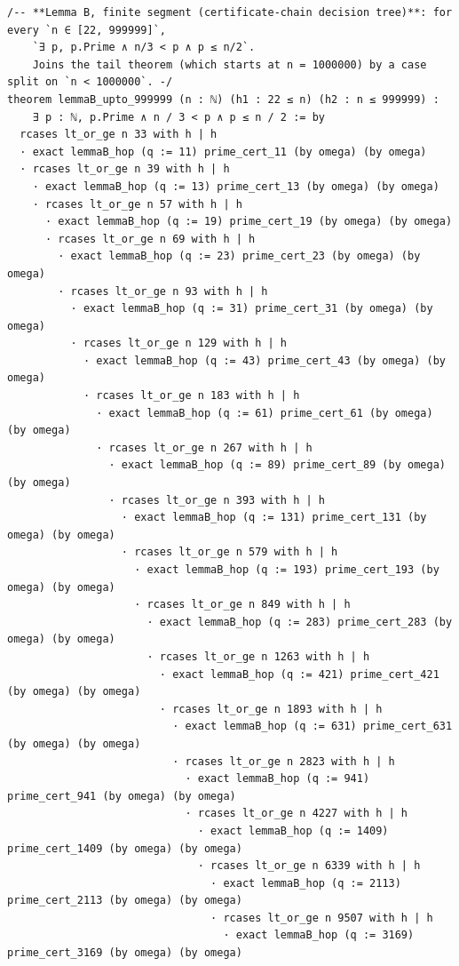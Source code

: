 \documentclass[11pt]{article}
\theoremstyle{definition}
\begin{document}
\begin{lstlisting}
/-- **Lemma B, finite segment (certificate-chain decision tree)**: for every `n ∈ [22, 999999]`,
    `∃ p, p.Prime ∧ n/3 < p ∧ p ≤ n/2`.
    Joins the tail theorem (which starts at n = 1000000) by a case split on `n < 1000000`. -/
theorem lemmaB_upto_999999 (n : ℕ) (h1 : 22 ≤ n) (h2 : n ≤ 999999) :
    ∃ p : ℕ, p.Prime ∧ n / 3 < p ∧ p ≤ n / 2 := by
  rcases lt_or_ge n 33 with h | h
  · exact lemmaB_hop (q := 11) prime_cert_11 (by omega) (by omega)
  · rcases lt_or_ge n 39 with h | h
    · exact lemmaB_hop (q := 13) prime_cert_13 (by omega) (by omega)
    · rcases lt_or_ge n 57 with h | h
      · exact lemmaB_hop (q := 19) prime_cert_19 (by omega) (by omega)
      · rcases lt_or_ge n 69 with h | h
        · exact lemmaB_hop (q := 23) prime_cert_23 (by omega) (by omega)
        · rcases lt_or_ge n 93 with h | h
          · exact lemmaB_hop (q := 31) prime_cert_31 (by omega) (by omega)
          · rcases lt_or_ge n 129 with h | h
            · exact lemmaB_hop (q := 43) prime_cert_43 (by omega) (by omega)
            · rcases lt_or_ge n 183 with h | h
              · exact lemmaB_hop (q := 61) prime_cert_61 (by omega) (by omega)
              · rcases lt_or_ge n 267 with h | h
                · exact lemmaB_hop (q := 89) prime_cert_89 (by omega) (by omega)
                · rcases lt_or_ge n 393 with h | h
                  · exact lemmaB_hop (q := 131) prime_cert_131 (by omega) (by omega)
                  · rcases lt_or_ge n 579 with h | h
                    · exact lemmaB_hop (q := 193) prime_cert_193 (by omega) (by omega)
                    · rcases lt_or_ge n 849 with h | h
                      · exact lemmaB_hop (q := 283) prime_cert_283 (by omega) (by omega)
                      · rcases lt_or_ge n 1263 with h | h
                        · exact lemmaB_hop (q := 421) prime_cert_421 (by omega) (by omega)
                        · rcases lt_or_ge n 1893 with h | h
                          · exact lemmaB_hop (q := 631) prime_cert_631 (by omega) (by omega)
                          · rcases lt_or_ge n 2823 with h | h
                            · exact lemmaB_hop (q := 941) prime_cert_941 (by omega) (by omega)
                            · rcases lt_or_ge n 4227 with h | h
                              · exact lemmaB_hop (q := 1409) prime_cert_1409 (by omega) (by omega)
                              · rcases lt_or_ge n 6339 with h | h
                                · exact lemmaB_hop (q := 2113) prime_cert_2113 (by omega) (by omega)
                                · rcases lt_or_ge n 9507 with h | h
                                  · exact lemmaB_hop (q := 3169) prime_cert_3169 (by omega) (by omega)

\end{lstlisting}
\end{document}
